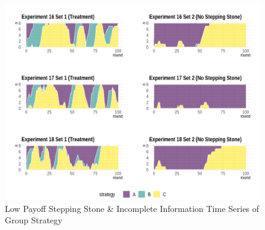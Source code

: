 \begin{figure}[h]
\captionsetup{justification=centering}
  \caption{Low Payoff Stepping Stone \& Incomplete Information Time Series of Group Strategy}
   \label{fig:Series3I}
    \includegraphics[width = \textwidth]{Images/AllAreaPlot3I.png}
    
\end{figure}

